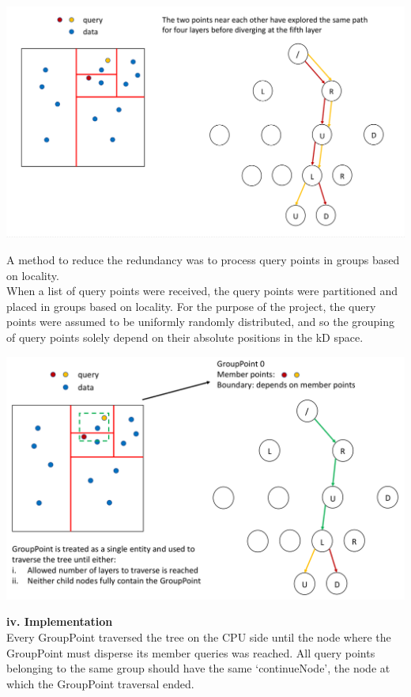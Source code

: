 \documentclass{article}
\begin{document}
\\
\begin{center}
\includegraphics[scale=0.25]{00}
\end{center}
A method to reduce the redundancy was to process query points in groups based on locality.\\
When a list of query points were received, the query points were partitioned and placed in groups based on locality. For the purpose of the project, the query points were assumed to be uniformly randomly distributed, and so the grouping of query points solely depend on their absolute positions in the kD space.\\
\begin{center}
\includegraphics[scale=0.25]{01}
\end{center}
\newpage\noindent
\textbf{iv. Implementation}\\
Every GroupPoint traversed the tree on the CPU side until the node
where the GroupPoint must disperse its member queries was reached.
All query points belonging to the same group should have the same ‘continueNode’, the node at which the GroupPoint traversal ended.\\
\end{document}

